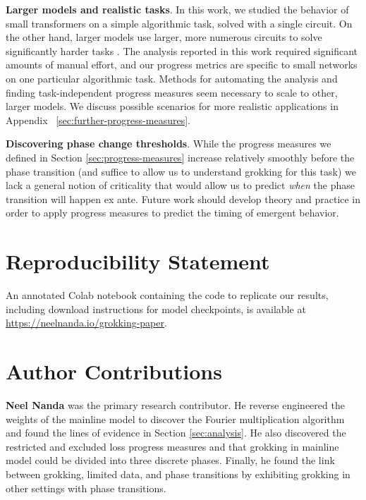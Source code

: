 \documentclass{article} %
\begin{document}

\textbf{Larger models and realistic tasks}. In this work, we studied the behavior of small transformers on a simple algorithmic task, solved with a single circuit. On the other hand, larger models use larger, more numerous circuits to solve significantly harder tasks \citep{cammarata2020thread, wang2022interpretability}. The analysis reported in this work required significant amounts of manual effort, and our progress metrics are specific to small networks on one particular algorithmic task. Methods for automating the analysis and finding task-independent progress measures seem necessary to scale to other, larger models. We discuss possible scenarios for more realistic applications in Appendix ~\ref{sec:further-progress-measures}. %

\textbf{Discovering phase change thresholds}. While the progress measures we defined in Section \ref{sec:progress-measures} increase relatively smoothly before the phase transition (and suffice to allow us to understand grokking for this task) we lack a general notion of criticality that would allow us to predict \emph{when} the phase transition will happen ex ante. Future work should develop theory and practice in order to apply progress measures to predict the timing of emergent behavior. 





\section*{Reproducibility Statement}
An annotated Colab notebook containing the code to replicate our results, including download instructions for model checkpoints, is available at \url{https://neelnanda.io/grokking-paper}.


\section*{Author Contributions}
\textbf{Neel Nanda} was the primary research contributor. He reverse engineered the weights of the mainline model to discover the Fourier multiplication algorithm and found the lines of evidence in Section \ref{sec:analysis}. He also discovered the restricted and excluded loss progress measures and that grokking in mainline model could be divided into three discrete phases. Finally, he found the link between grokking, limited data, and phase transitions by exhibiting grokking in other settings with phase transitions.
\end{document}
